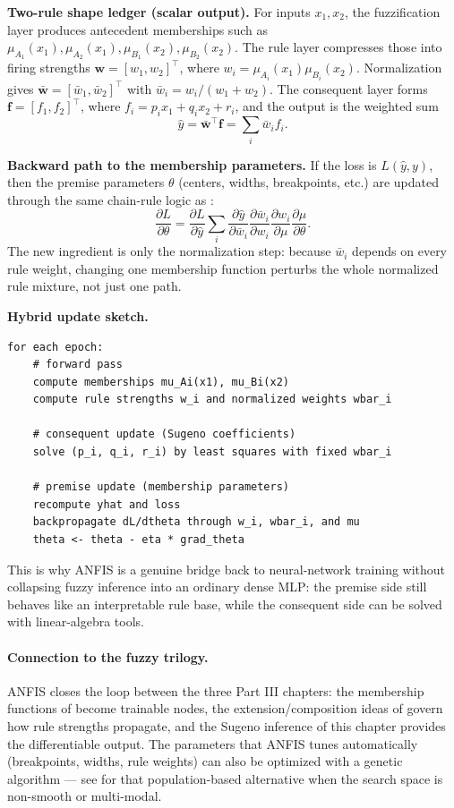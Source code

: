 \begin{tcolorbox}[summarybox, breakable, title={ANFIS ledger: what flows forward, what flows backward}]
\textbf{Two-rule shape ledger (scalar output).} For inputs \(x_1,x_2\), the fuzzification layer produces antecedent memberships such as \(\mu_{A_1}(x_1), \mu_{A_2}(x_1), \mu_{B_1}(x_2), \mu_{B_2}(x_2)\). The rule layer compresses those into firing strengths \(\mathbf{w}=[w_1,w_2]^\top\), where \(w_i=\mu_{A_i}(x_1)\mu_{B_i}(x_2)\). Normalization gives \(\bar{\mathbf{w}}=[\bar w_1,\bar w_2]^\top\) with \(\bar w_i=w_i/(w_1+w_2)\). The consequent layer forms \(\mathbf{f}=[f_1,f_2]^\top\), where \(f_i=p_i x_1 + q_i x_2 + r_i\), and the output is the weighted sum
\[
\hat y = \bar{\mathbf{w}}^\top \mathbf{f} = \sum_i \bar w_i f_i.
\]

\textbf{Backward path to the membership parameters.} If the loss is \(L(\hat y, y)\), then the premise parameters \(\theta\) (centers, widths, breakpoints, etc.) are updated through the same chain-rule logic as :
\[
\frac{\partial L}{\partial \theta}
=
\frac{\partial L}{\partial \hat y}
\sum_i
\frac{\partial \hat y}{\partial \bar w_i}
\frac{\partial \bar w_i}{\partial w_i}
\frac{\partial w_i}{\partial \mu}
\frac{\partial \mu}{\partial \theta}.
\]
The new ingredient is only the normalization step: because \(\bar w_i\) depends on every rule weight, changing one membership function perturbs the whole normalized rule mixture, not just one path.

\textbf{Hybrid update sketch.}
\begin{verbatim}
for each epoch:
    # forward pass
    compute memberships mu_Ai(x1), mu_Bi(x2)
    compute rule strengths w_i and normalized weights wbar_i

    # consequent update (Sugeno coefficients)
    solve (p_i, q_i, r_i) by least squares with fixed wbar_i

    # premise update (membership parameters)
    recompute yhat and loss
    backpropagate dL/dtheta through w_i, wbar_i, and mu
    theta <- theta - eta * grad_theta
\end{verbatim}
This is why ANFIS is a genuine bridge back to neural-network training without collapsing fuzzy inference into an ordinary dense MLP: the premise side still behaves like an interpretable rule base, while the consequent side can be solved with linear-algebra tools.
\end{tcolorbox}

\paragraph{Connection to the fuzzy trilogy.}
ANFIS closes the loop between the three Part III chapters: the membership functions of  become trainable nodes, the extension/composition ideas of  govern how rule strengths propagate, and the Sugeno inference of this chapter provides the differentiable output. The parameters that ANFIS tunes automatically (breakpoints, widths, rule weights) can also be optimized with a genetic algorithm --- see  for that population-based alternative when the search space is non-smooth or multi-modal.

